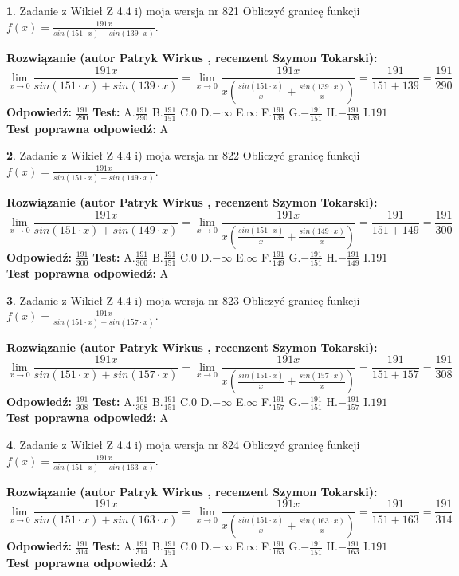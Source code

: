 \documentclass[12pt, a4paper]{article}
\theoremstyle{definition} %
\newtheorem{zad}{}
\newcommand{\zadStart}[1]{\begin{zad}#1\newline}
\newcommand{\zadStop}{\end{zad}}
\newcommand{\rozwStart}[2]{\noindent \textbf{Rozwiązanie (autor #1 , recenzent #2): }\newline}
\newcommand{\rozwStop}{\newline}
\newcommand{\odpStart}{\noindent \textbf{Odpowiedź:}\newline}
\newcommand{\odpStop}{\newline}
\newcommand{\testStart}{\noindent \textbf{Test:}\newline}
\newcommand{\testStop}{\newline}
\newcommand{\kluczStart}{\noindent \textbf{Test poprawna odpowiedź:}\newline}
\newcommand{\kluczStop}{\newline}
\begin{document}
\zadStart{Zadanie z Wikieł Z 4.4 i) moja wersja nr 821}
Obliczyć granicę funkcji $f(x)=\frac{191x}{sin(151\cdot x) +sin(139\cdot x)}$.
\zadStop
\rozwStart{Patryk Wirkus}{Szymon Tokarski}
$$\lim\limits_{x\to 0}\frac{191x}{sin(151\cdot x) +sin(139\cdot x)}=\lim\limits_{x\to 0}\frac{191x}{x(\frac{sin(151\cdot x)}{x}+\frac{sin(139\cdot x)}{x})}=\frac{191}{151+139} = \frac{191}{290}$$
\rozwStop
\odpStart
$\frac{191}{290}$
\odpStop
\testStart
A.$\frac{191}{290}$
B.$\frac{191}{151}$
C.$0$
D.$-\infty$
E.$\infty$
F.$\frac{191}{139}$
G.$-\frac{191}{151}$
H.$-\frac{191}{139}$
I.$191$
\testStop
\kluczStart
A
\kluczStop



\zadStart{Zadanie z Wikieł Z 4.4 i) moja wersja nr 822}
Obliczyć granicę funkcji $f(x)=\frac{191x}{sin(151\cdot x) +sin(149\cdot x)}$.
\zadStop
\rozwStart{Patryk Wirkus}{Szymon Tokarski}
$$\lim\limits_{x\to 0}\frac{191x}{sin(151\cdot x) +sin(149\cdot x)}=\lim\limits_{x\to 0}\frac{191x}{x(\frac{sin(151\cdot x)}{x}+\frac{sin(149\cdot x)}{x})}=\frac{191}{151+149} = \frac{191}{300}$$
\rozwStop
\odpStart
$\frac{191}{300}$
\odpStop
\testStart
A.$\frac{191}{300}$
B.$\frac{191}{151}$
C.$0$
D.$-\infty$
E.$\infty$
F.$\frac{191}{149}$
G.$-\frac{191}{151}$
H.$-\frac{191}{149}$
I.$191$
\testStop
\kluczStart
A
\kluczStop



\zadStart{Zadanie z Wikieł Z 4.4 i) moja wersja nr 823}
Obliczyć granicę funkcji $f(x)=\frac{191x}{sin(151\cdot x) +sin(157\cdot x)}$.
\zadStop
\rozwStart{Patryk Wirkus}{Szymon Tokarski}
$$\lim\limits_{x\to 0}\frac{191x}{sin(151\cdot x) +sin(157\cdot x)}=\lim\limits_{x\to 0}\frac{191x}{x(\frac{sin(151\cdot x)}{x}+\frac{sin(157\cdot x)}{x})}=\frac{191}{151+157} = \frac{191}{308}$$
\rozwStop
\odpStart
$\frac{191}{308}$
\odpStop
\testStart
A.$\frac{191}{308}$
B.$\frac{191}{151}$
C.$0$
D.$-\infty$
E.$\infty$
F.$\frac{191}{157}$
G.$-\frac{191}{151}$
H.$-\frac{191}{157}$
I.$191$
\testStop
\kluczStart
A
\kluczStop



\zadStart{Zadanie z Wikieł Z 4.4 i) moja wersja nr 824}
Obliczyć granicę funkcji $f(x)=\frac{191x}{sin(151\cdot x) +sin(163\cdot x)}$.
\zadStop
\rozwStart{Patryk Wirkus}{Szymon Tokarski}
$$\lim\limits_{x\to 0}\frac{191x}{sin(151\cdot x) +sin(163\cdot x)}=\lim\limits_{x\to 0}\frac{191x}{x(\frac{sin(151\cdot x)}{x}+\frac{sin(163\cdot x)}{x})}=\frac{191}{151+163} = \frac{191}{314}$$
\rozwStop
\odpStart
$\frac{191}{314}$
\odpStop
\testStart
A.$\frac{191}{314}$
B.$\frac{191}{151}$
C.$0$
D.$-\infty$
E.$\infty$
F.$\frac{191}{163}$
G.$-\frac{191}{151}$
H.$-\frac{191}{163}$
I.$191$
\testStop
\kluczStart
A
\kluczStop
\end{document}
